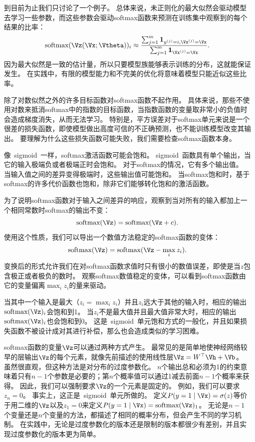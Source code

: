 到目前为止我们只讨论了一个例子。
总体来说，未正则化的最大似然会驱动模型去学习一些参数，而这些参数会驱动softmax函数来预测在训练集中观察到的每个结果的比率：
\begin{equation}
\text{softmax}(\Vz(\Vx; \Vtheta))_i \approx \frac{\sum_{j=1}^m \bm{1}_{y^{(j)}=i, \Vx^{(j)} = \Vx}  }{ \sum_{j=1}^{m} \bm{1}_{\Vx^{(j)} = \Vx} }.
\end{equation}
因为最大似然是一致的估计量，所以只要模型族能够表示训练的分布，这就能保证发生。
在实践中，有限的模型能力和不完美的优化将意味着模型只能近似这些比率。

除了对数似然之外的许多目标函数对softmax函数不起作用。
具体来说，那些不使用对数来抵消softmax中的指数的目标函数，当指数函数的变量取非常小的负值时会造成梯度消失，从而无法学习。
特别是，平方误差对于softmax单元来说是一个很差的损失函数，即使模型做出高度可信的不正确预测，也不能训练模型改变其输出\citep{Bridle-1990}。
要理解为什么这些损失函数可能失败，我们需要检查softmax函数本身。

像~\gls{sigmoid}~一样，softmax激活函数可能会饱和。
\gls{sigmoid}~函数具有单个输出，当它的输入极端负或者极端正时会饱和。
对于softmax的情况，它有多个输出值。
当输入值之间的差异变得极端时，这些输出值可能饱和。
当softmax饱和时，基于softmax的许多代价函数也饱和，除非它们能够转化饱和的激活函数。


为了说明softmax函数对于输入之间差异的响应，观察到当对所有的输入都加上一个相同常数时softmax的输出不变：
\begin{equation}
\text{softmax}(\Vz) = \text{softmax}(\Vz+c).
\end{equation}
使用这个性质，我们可以导出一个数值方法稳定的softmax函数的变体：
\begin{equation}
\text{softmax}(\Vz) = \text{softmax}(\Vz- \max_i z_i).
\end{equation}
变换后的形式允许我们在对softmax函数求值时只有很小的数值误差，即使是当$z$包含极正或者极负的数时。
观察softmax数值稳定的变体，可以看到softmax函数由它的变量偏离$\max_i z_i$的量来驱动。

当其中一个输入是最大（$z_i = \max_i z_i$）并且$z_i$远大于其他的输入时，相应的输出$\text{softmax}(\Vz)_i$会饱和到1。
当$z_i$不是最大值并且最大值非常大时，相应的输出$\text{softmax}(\Vz)_i$也会饱和到0。
这是~\gls{sigmoid}~单元饱和方式的一般化，并且如果损失函数不被设计成对其进行补偿，那么也会造成类似的学习困难。

softmax函数的变量$\Vz$可以通过两种方式产生。
最常见的是简单地使神经网络较早的层输出$\Vz$的每个元素，就像先前描述的使用线性层$\Vz={W}^\top\Vh+\Vb$。
虽然很直观，但这种方法是对分布的过度参数化。
$n$个输出总和必须为1的约束意味着只有$n-1$个参数是必要的；第$n$个概率值可以通过1减去前面$n-1$个概率来获得。
因此，我们可以强制要求$\Vz$的一个元素是固定的。
例如，我们可以要求$z_n=0$。
事实上，这正是~\gls{sigmoid}~单元所做的。
定义$P(y=1\mid\Vx)=\sigma(z)$等价于用二维的$\Vz$以及$z_1=0$来定义$P(y=1\mid\Vx)=\text{softmax}(\Vz)_1$。
无论是$n-1$个变量还是$n$个变量的方法，都描述了相同的概率分布，但会产生不同的学习机制。
在实践中，无论是过度参数化的版本还是限制的版本都很少有差别，并且实现过度参数化的版本更为简单。

